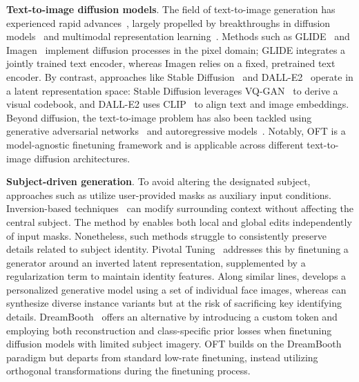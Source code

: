 \textbf{Text-to-image diffusion models}. The field of text-to-image generation has experienced rapid advances~\cite{saharia2022photorealistic,ramesh2022hierarchical,rombach2022high,gu2022vector,nichol2022glide}, largely propelled by breakthroughs in diffusion models~\cite{ho2020denoising,song2021score,song2021denoising,dhariwal2021diffusion} and multimodal representation learning~\cite{su2020vlbert,lu2019vilbert,radford2021learning,wang2021simvlm,li2022blip,li2023blip,alayrac2022flamingo,schuhmann2022laion}. Methods such as GLIDE~\cite{nichol2022glide} and Imagen~\cite{saharia2022photorealistic} implement diffusion processes in the pixel domain; GLIDE integrates a jointly trained text encoder, whereas Imagen relies on a fixed, pretrained text encoder. By contrast, approaches like Stable Diffusion~\cite{rombach2022high} and DALL-E2~\cite{ramesh2022hierarchical} operate in a latent representation space: Stable Diffusion leverages VQ-GAN~\cite{esser2021taming} to derive a visual codebook, and DALL-E2 uses CLIP~\cite{radford2021learning} to align text and image embeddings. Beyond diffusion, the text-to-image problem has also been tackled using generative adversarial networks~\cite{reed2016generative,zhang2017stackgan,xu2018attngan,li2019controllable} and autoregressive models~\cite{ramesh2021zero,ding2021cogview,wu2022nuwa,yuscaling}. Notably, OFT is a model-agnostic finetuning framework and is applicable across different text-to-image diffusion architectures.

\textbf{Subject-driven generation}. To avoid altering the designated subject, approaches such as \cite{avrahami2022blended,nichol2022glide} utilize user-provided masks as auxiliary input conditions. Inversion-based techniques~\cite{choi2021ilvr,dhariwal2021diffusion,ramesh2022hierarchical,gal2022image} can modify surrounding context without affecting the central subject. The method by \cite{hertz2022prompt} enables both local and global edits independently of input masks. Nonetheless, such methods struggle to consistently preserve details related to subject identity. Pivotal Tuning~\cite{roich2022pivotal} addresses this by finetuning a generator around an inverted latent representation, supplemented by a regularization term to maintain identity features. Along similar lines, \cite{nitzan2022mystyle} develops a personalized generative model using a set of individual face images, whereas \cite{casanova2021instance} can synthesize diverse instance variants but at the risk of sacrificing key identifying details. DreamBooth~\cite{ruiz2023dreambooth} offers an alternative by introducing a custom token and employing both reconstruction and class-specific prior losses when finetuning diffusion models with limited subject imagery. OFT builds on the DreamBooth paradigm but departs from standard low-rate finetuning, instead utilizing orthogonal transformations during the finetuning process.

